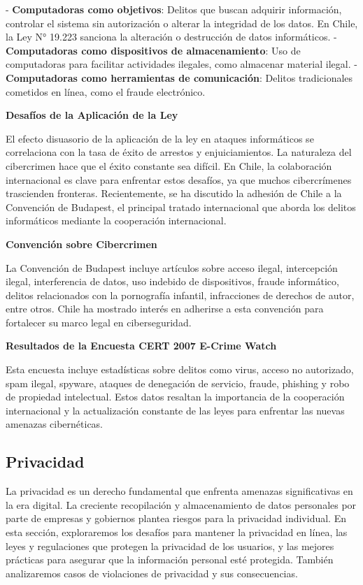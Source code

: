 - \textbf{Computadoras como objetivos}: Delitos que buscan adquirir información, controlar el sistema sin autorización o alterar la integridad de los datos. En Chile, la Ley N° 19.223 sanciona la alteración o destrucción de datos informáticos.
- \textbf{Computadoras como dispositivos de almacenamiento}: Uso de computadoras para facilitar actividades ilegales, como almacenar material ilegal.
- \textbf{Computadoras como herramientas de comunicación}: Delitos tradicionales cometidos en línea, como el fraude electrónico.

\textbf{Desafíos de la Aplicación de la Ley}

El efecto disuasorio de la aplicación de la ley en ataques informáticos se correlaciona con la tasa de éxito de arrestos y enjuiciamientos. La naturaleza del cibercrimen hace que el éxito constante sea difícil. En Chile, la colaboración internacional es clave para enfrentar estos desafíos, ya que muchos cibercrímenes trascienden fronteras. Recientemente, se ha discutido la adhesión de Chile a la Convención de Budapest, el principal tratado internacional que aborda los delitos informáticos mediante la cooperación internacional.

\textbf{Convención sobre Cibercrimen}

La Convención de Budapest incluye artículos sobre acceso ilegal, intercepción ilegal, interferencia de datos, uso indebido de dispositivos, fraude informático, delitos relacionados con la pornografía infantil, infracciones de derechos de autor, entre otros. Chile ha mostrado interés en adherirse a esta convención para fortalecer su marco legal en ciberseguridad.

\textbf{Resultados de la Encuesta CERT 2007 E-Crime Watch}

Esta encuesta incluye estadísticas sobre delitos como virus, acceso no autorizado, spam ilegal, spyware, ataques de denegación de servicio, fraude, phishing y robo de propiedad intelectual. Estos datos resaltan la importancia de la cooperación internacional y la actualización constante de las leyes para enfrentar las nuevas amenazas cibernéticas.


\subsection{Privacidad}
La privacidad es un derecho fundamental que enfrenta amenazas significativas en la era digital. La creciente recopilación y almacenamiento de datos personales por parte de empresas y gobiernos plantea riesgos para la privacidad individual. En esta sección, exploraremos los desafíos para mantener la privacidad en línea, las leyes y regulaciones que protegen la privacidad de los usuarios, y las mejores prácticas para asegurar que la información personal esté protegida. También analizaremos casos de violaciones de privacidad y sus consecuencias.

